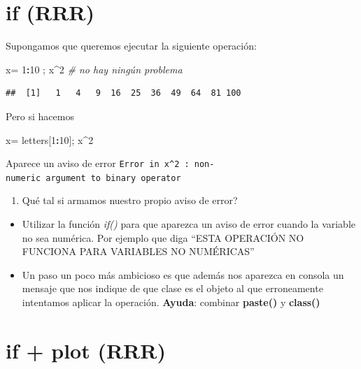 \documentclass[]{book}
\newenvironment{Shaded}{\begin{snugshade}}{\end{snugshade}}
\newcommand{\CommentTok}[1]{\textcolor[rgb]{0.56,0.35,0.01}{\textit{#1}}}
\newcommand{\DecValTok}[1]{\textcolor[rgb]{0.00,0.00,0.81}{#1}}
\newcommand{\NormalTok}[1]{#1}
\newcommand{\OperatorTok}[1]{\textcolor[rgb]{0.81,0.36,0.00}{\textbf{#1}}}
\newcommand{\StringTok}[1]{\textcolor[rgb]{0.31,0.60,0.02}{#1}}
\providecommand{\tightlist}{%
  \setlength{\itemsep}{0pt}\setlength{\parskip}{0pt}}
\begin{document}
\hypertarget{if-rrr}{%
\section{if (RRR)}\label{if-rrr}}

Supongamos que queremos ejecutar la siguiente operación:

\begin{Shaded}
\begin{Highlighting}[]
\NormalTok{        x=}\StringTok{ }\DecValTok{1}\OperatorTok{:}\DecValTok{10}\NormalTok{  ; x}\OperatorTok{^}\DecValTok{2}  \CommentTok{# no hay ningún problema}
\end{Highlighting}
\end{Shaded}

\begin{verbatim}
##  [1]   1   4   9  16  25  36  49  64  81 100
\end{verbatim}

Pero si hacemos

\begin{Shaded}
\begin{Highlighting}[]
\NormalTok{      x=}\StringTok{ }\NormalTok{letters[}\DecValTok{1}\OperatorTok{:}\DecValTok{10}\NormalTok{]; x}\OperatorTok{^}\DecValTok{2} 
\end{Highlighting}
\end{Shaded}

Aparece un aviso de error \texttt{Error\ in\ x\^{}2\ :\ non-numeric\ argument\ to\ binary\ operator}

\begin{enumerate}
\def\labelenumi{\arabic{enumi}.}
\tightlist
\item
  Qué tal si armamos nuestro propio aviso de error?
\end{enumerate}

\begin{itemize}
\item
  Utilizar la función \emph{if()} para que aparezca un aviso de error cuando la variable no sea numérica. Por ejemplo que diga ``ESTA OPERACIÓN NO FUNCIONA PARA VARIABLES NO NUMÉRICAS''
\item
  Un paso un poco más ambicioso es que además nos aparezca en consola un mensaje que nos indique de que clase es el objeto al que erroneamente intentamos aplicar la operación. \textbf{Ayuda}: combinar \textbf{paste()} y \textbf{class()}
\end{itemize}

\hypertarget{if-plot-rrr}{%
\section{if + plot (RRR)}\label{if-plot-rrr}}
\end{document}
